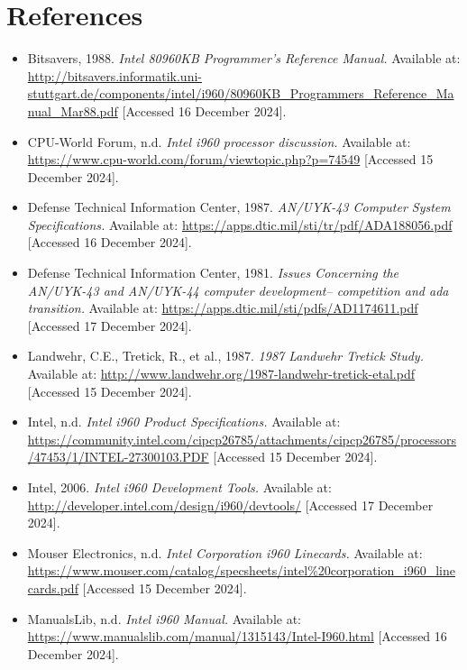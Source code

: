 \documentclass{article}
\begin{document}
\section{References}
\begin{itemize}

\item Bitsavers, 1988. \textit{Intel 80960KB Programmer's Reference Manual.} Available at: \url{http://bitsavers.informatik.uni-stuttgart.de/components/intel/i960/80960KB_Programmers_Reference_Manual_Mar88.pdf} [Accessed 16 December 2024].
\item CPU-World Forum, n.d. \textit{Intel i960 processor discussion.} Available at: \url{https://www.cpu-world.com/forum/viewtopic.php?p=74549} [Accessed 15 December 2024].
\item Defense Technical Information Center, 1987. \textit{AN/UYK-43 Computer System Specifications.} Available at: \url{https://apps.dtic.mil/sti/tr/pdf/ADA188056.pdf} [Accessed 16 December 2024].
\item Defense Technical Information Center, 1981. \textit{Issues Concerning the AN/UYK-43 and AN/UYK-44 computer development--
competition and ada transition.} Available at: \url{https://apps.dtic.mil/sti/pdfs/AD1174611.pdf} [Accessed 17 December 2024].
\item Landwehr, C.E., Tretick, R., et al., 1987. \textit{1987 Landwehr Tretick Study.} Available at: \url{http://www.landwehr.org/1987-landwehr-tretick-etal.pdf} [Accessed 15 December 2024].

\item Intel, n.d. \textit{Intel i960 Product Specifications.} Available at: \url{https://community.intel.com/cipcp26785/attachments/cipcp26785/processors/47453/1/INTEL-27300103.PDF} [Accessed 15 December 2024].

\item Intel, 2006. \textit{Intel i960 Development Tools.} Available at: \url{http://developer.intel.com/design/i960/devtools/} [Accessed 17 December 2024].


\item Mouser Electronics, n.d. \textit{Intel Corporation i960 Linecards.} Available at: \url{https://www.mouser.com/catalog/specsheets/intel%20corporation_i960_linecards.pdf} [Accessed 15 December 2024].

\item ManualsLib, n.d. \textit{Intel i960 Manual.} Available at: \url{https://www.manualslib.com/manual/1315143/Intel-I960.html} [Accessed 16 December 2024].


\end{itemize}
\end{document}
